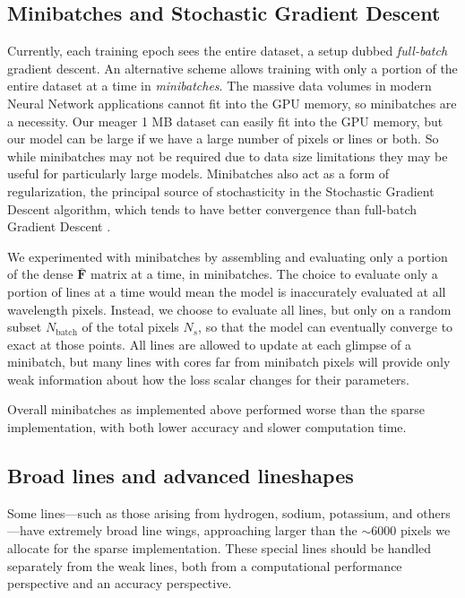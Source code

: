 \documentclass[twocolumn]{aastex631}
\begin{document}
\subsection{Minibatches and Stochastic Gradient Descent}

Currently, each training epoch sees the entire dataset, a setup dubbed \emph{full-batch} gradient descent.
An alternative scheme allows training with only a portion of the entire dataset at a time in \emph{minibatches}.  The massive data volumes in modern Neural Network applications cannot fit into the GPU memory, so minibatches are a necessity.  Our meager 1 MB dataset can easily fit into the GPU memory, but our model can be large if we have a large number of pixels or lines or both.
So while minibatches may not be required due to data size limitations they may be useful for particularly large models.
Minibatches also act as a form of regularization, the principal source of stochasticity in the Stochastic Gradient Descent algorithm, which tends to have better convergence than full-batch Gradient Descent \citep{2016arXiv160904747R}.

We experimented with minibatches by assembling and evaluating only a portion of the dense $\bar{\bm{F}}$ matrix at a time, in minibatches. The choice to evaluate only a portion of lines at a time would mean the model is inaccurately evaluated at all wavelength pixels. Instead, we choose to evaluate all lines, but only on a random subset $N_{\mathrm{batch}}$ of the total pixels $N_s$, so that the model can eventually converge to exact at those points. All lines are allowed to update at each glimpse of a minibatch, but many lines with cores far from minibatch pixels will provide only weak information about how the loss scalar changes for their parameters.

Overall minibatches as implemented above performed worse than the sparse implementation, with both lower accuracy and slower computation time.

\subsection{Broad lines and advanced lineshapes}

Some lines---such as those arising from hydrogen, sodium, potassium, and others---have extremely broad line wings, approaching larger than the $\sim6000$ pixels we allocate for the sparse implementation. These special lines should be handled separately from the weak lines, both from a computational performance perspective and an accuracy perspective.
\end{document}
